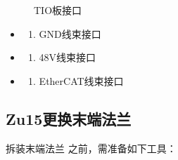 \documentclass[a4paper,11pt,english,openany,oneside]{sphinxmanual}
\begin{document}
\begin{figure}[H]
\centering
\capstart

\noindent{}
\caption{TIO板接口}\label{\detokenize{_u66f4_u6362_u672b_u7aef_u6cd5_u5170:id7}}\end{figure}
\begin{itemize}
\item {} \begin{enumerate}
%
\item {} 
\sphinxAtStartPar
GND线束接口

\end{enumerate}

\item {} \begin{enumerate}
%
\setcounter{enumi}{1}
\item {} 
\sphinxAtStartPar
48V线束接口

\end{enumerate}

\item {} \begin{enumerate}
%
\setcounter{enumi}{2}
\item {} 
\sphinxAtStartPar
EtherCAT线束接口

\end{enumerate}

\end{itemize}


\subsection{Zu15更换末端法兰}
\label{\detokenize{_u66f4_u6362_u672b_u7aef_u6cd5_u5170:zu15}}\label{\detokenize{_u66f4_u6362_u672b_u7aef_u6cd5_u5170:id5}}
\sphinxAtStartPar
拆装末端法兰 之前，需准备如下工具：
\end{document}

